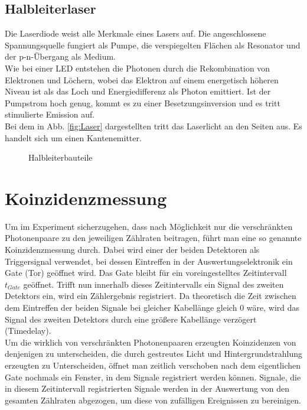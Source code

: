\documentclass[twoside,colorback,accentcolor=tud4c,11pt]{tudreport}
\begin{document}
\subsection{Halbleiterlaser}\label{laser}
Die Laserdiode weist alle Merkmale eines Lasers auf. Die angeschlossene Spannungsquelle fungiert als Pumpe, die verspiegelten Flächen als Resonator und der p-n-Übergang als Medium.\\
Wie bei einer LED entstehen die Photonen durch die Rekombination von Elektronen und Löchern, wobei das Elektron auf einem energetisch höheren Niveau ist als das Loch und Energiedifferenz als Photon emittiert. Ist der Pumpstrom hoch genug, kommt es zu einer Besetzungsinversion und es tritt stimulierte Emission auf.\\
Bei dem in Abb. \ref{fig:Laser} dargestellten tritt das Laserlicht an den Seiten aus. Es handelt sich um einen Kantenemitter.
\begin{figure}[H]
  \centering
    \quad 
  \quad   
  \caption{Halbleiterbauteile}
  \label{fig:halbleiter}
\end{figure}
\section{Koinzidenzmessung}
Um im Experiment sicherzugehen, dass nach Möglichkeit nur die verschränkten Photonenpaare zu den jeweiligen Zählraten beitragen, führt man eine so genannte Koinzidenzmessung durch. Dabei wird einer der beiden Detektoren als Triggersignal verwendet, bei dessen Eintreffen in der Auswertungselektronik ein Gate (Tor) geöffnet wird. Das Gate bleibt für ein voreingestelltes Zeitintervall $t_{Gate}$ geöffnet. Trifft nun innerhalb dieses Zeitintervalls ein Signal des zweiten Detektors ein, wird ein Zählergebnis registriert. Da theoretisch die Zeit zwischen dem Eintreffen der beiden Signale bei gleicher Kabellänge gleich 0 wäre, wird das Signal des zweiten Detektors durch eine größere Kabellänge verzögert (Timedelay).\\
Um die wirklich von verschränkten Photonenpaaren erzeugten Koinzidenzen von denjenigen zu unterscheiden, die durch gestreutes Licht und Hintergrundstrahlung erzeugten zu Unterscheiden, öffnet man zeitlich verschoben nach dem eigentlichen Gate nochmals ein Fenster, in dem  Signale registriert werden können. Signale, die in diesem Zeitintervall registrierten Signale werden in der Auswertung von den gesamten Zählraten abgezogen, um diese von zufälligen Ereignissen zu bereinigen.
\end{document}
